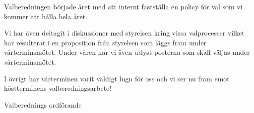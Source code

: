 \documentclass[../_main/handlingar.tex]{subfiles}
\begin{document}
Valberedningen började året med att internt fastställa en policy för val som vi kommer att hålla hela året.

Vi har även deltagit i diskussioner med styrelsen kring vissa valprocesser vilket har resulterat i en proposition från styrelsen som läggs fram under vårterminsmötet. Under våren har vi även utlyst posterna som skall väljas under vårterminsmötet.

I övrigt har vårterminen varit väldigt lugn för oss och vi ser nu fram emot höstterminens valberedningsarbete!

\begin{signatures}{1}
    \mvh
    \signature{Pontus Landgren}{Valberednings ordförande}
\end{signatures}
\end{document}
